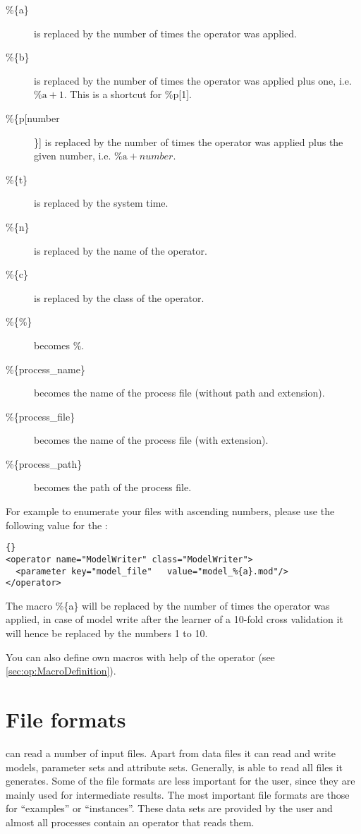 {  \begin{description}
  \item[\%\{a\}] is replaced by the number of times the operator was
  applied.
  \item[\%\{b\}] is replaced by the number of times the operator was
  applied plus one, i.e. $\%\textrm{a} + 1$. This is a shortcut for \%p[1].
  \item[\%\{p[number]\}] is replaced by the number of times the operator was
  applied plus the given number, i.e. $\%\textrm{a} + number$.
  \item[\%\{t\}] is replaced by the system time.
  \item[\%\{n\}] is replaced by the name of the operator.
  \item[\%\{c\}] is replaced by the class of the operator.
  \item[\%\{\%\}] becomes \%.
  \item[\%\{process\_name\}] becomes the name of the process file (without path and extension).
  \item[\%\{process\_file\}] becomes the name of the process file (with extension).
  \item[\%\{process\_path\}] becomes the path of the process file.
  \end{description}

For example to enumerate your files with ascending numbers, please use the following
value for the  : 

\begin{lstlisting}[style=rapidminerxmlstyle]{}
<operator name="ModelWriter" class="ModelWriter">
  <parameter key="model_file"	value="model_%{a}.mod"/>
</operator>
\end{lstlisting}

The macro \%\{a\} will be replaced by the number of times the operator was applied, 
in case of model write after the learner of a 10-fold cross validation it will hence
be replaced by the numbers 1 to 10.

You can also define own macros with help of the  operator 
(see \ref{sec:op:MacroDefinition}).



\section{File formats}
\label{sec:inputfiles}

\rapidminer can read a number of input files. Apart from data files it can
read and write models, parameter sets and attribute sets. Generally, \rapidminer
is able to read all files it generates. Some of the file formats are
less important for the user, since they are mainly used for intermediate
results. The most important file formats are those for ``examples'' or
``instances''. These data sets are provided by the user and almost all
processes contain an operator that reads them.


}
